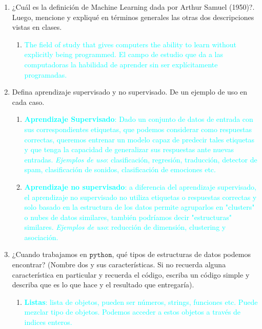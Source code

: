 \documentclass{exam}
\theoremstyle{definition}
\begin{document}
\begin{enumerate}
    \item ¿Cuál es la definición de Machine Learning dada por Arthur Samuel (1950)?. Luego, mencione y expliqué en términos generales las otras dos descripciones vistas en clases.
    \begin{enumerate}
    \item \textcolor{cyan}{The field of study that gives computers the ability to learn without explicitly being programmed. El campo de estudio que da a las computadoras la habilidad de aprender sin ser explícitamente programadas.} \textcolor{black}{}
    \end{enumerate}
    \item Defina aprendizaje supervisado y no supervisado. De un ejemplo de uso en cada caso. 
    \begin{enumerate}
    \item \textcolor{cyan}{\textbf{Aprendizaje Supervisado}: Dado un conjunto de datos de entrada con sus correspondientes etiquetas, que podemos considerar como respuestas correctas, queremos entrenar un modelo capaz de predecir tales etiquetas y que tenga la capacidad de generalizar sus respuestas ante nuevas entradas. \textit{Ejemplos de uso}: clasificación, regresión, traducción, detector de spam, clasificación de sonidos, clasificación de emociones etc.}\textcolor{black}{}
    \item \textcolor{cyan}{\textbf{Aprendizaje no supervisado}: a diferencia del aprendizaje supervisado, el aprendizaje no supervisado no utiliza etiquetas o respuestas correctas y solo basado en la estructura de los datos permite agruparlos en "clusters" o nubes de datos similares, también podríamos decir "estructuras" similares. \textit{Ejemplos de uso}: reducción de dimensión, clustering y asociación. }\textcolor{black}{}
    \end{enumerate}
    \item ¿Cuando trabajamos en $\mathtt{python}$, qué tipos de estructuras de datos podemos encontrar? (Nombre dos y sus características. Si no recuerda alguna característica en particular y recuerda el código, escriba un código simple y describa que es lo que hace y el resultado que entregaría).
    \begin{enumerate}
    \item \textcolor{cyan}{\textbf{Listas}: lista de objetos, pueden ser números, strings, funciones etc. Puede mezclar tipo de objetos. Podemos acceder a estos objetos a través de indices enteros.} 
    \begin{python}

\end{python}
\end{enumerate}
\end{enumerate}
\end{document}
